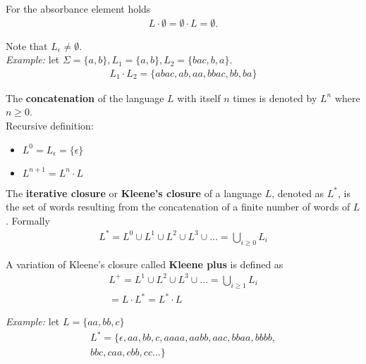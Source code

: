 For the absorbance element holds
\begin{align*}
  L \cdot \emptyset = \emptyset \cdot L = \emptyset.
\end{align*}

Note that $L_\epsilon \neq \emptyset$.\\

\textit{Example:} let $\Sigma = \{a,b\}, L_1 = \{a, b\}, L_2 = \{bac, b, a\} $.
\begin{align*}
  L_1 \cdot L_2 = \{abac, ab, aa, bbac, bb, ba\}
\end{align*}

The \textbf{concatenation} of the language $L$ with itself $n$ times is denoted by $L^n$ where $n \geq 0$.\\

Recursive definition:
\begin{itemize}
  \item $L^0 = L_\epsilon = \{\epsilon\}$
  \item $L^{n+1} = L^n \cdot L$
\end{itemize}

The \textbf{iterative closure} or \textbf{Kleene's closure} of a language $L$,
denoted as $L^{*}$, is the set of words resulting from the concatenation 
of a finite number of words of $L$. Formally
\begin{align*}
  L^{*} = L^0 \cup L^1 \cup L^2 \cup L^3 \cup \dots = \bigcup_{i \geq 0} L_i
\end{align*}

A variation of Kleene's closure called \textbf{Kleene plus} is defined as
\begin{align*}
  L^{+} =  L^1 \cup L^2 \cup L^3 \cup \dots = \bigcup_{i \geq 1} L_i \\ = L \cdot L^{*} = L^{*} \cdot L
\end{align*}

\textit{Example:} let $L = \{aa, bb, c\}$
\begin{align*}
  L^{*} = \{\epsilon, aa, bb, c, aaaa, aabb, aac, bbaa, bbbb,\\ bbc, caa, cbb, cc \dots\}
\end{align*}
